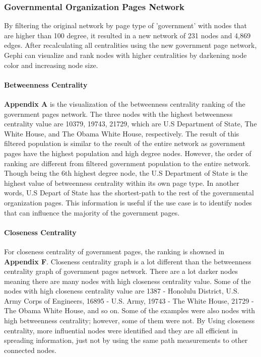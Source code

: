 \documentclass[11pt,twocolumn]{article}
\begin{document}
\subsubsection{Governmental Organization Pages Network}
By filtering the original network by page type of 'government' with nodes that are higher than 100 degree, it resulted in a new network of 231 nodes and 4,869 edges. After recalculating all centralities using the new government page network, Gephi can visualize and rank nodes with higher centralities by darkening node color and increasing node size. 

\paragraph{Betweenness Centrality}
\textbf{Appendix A} is the visualization of the betweenness centrality ranking of the government pages network. The three nodes with the highest betweenness centrality value are 10379, 19743, 21729, which are U.S Department of State, The White House, and The Obama White House, respectively. The result of this filtered population is similar to the result of the entire network as government pages have the highest population and high degree nodes. However, the order of ranking are different from filtered government population to the entire network. Though being the 6th highest degree node, the U.S Department of State is the highest value of betweenness centrality within its own page type. In another words, U.S Depart of State has the shortest-path to the rest of the governmental organization pages. This information is useful if the use case is to identify nodes that can influence the majority of the government pages. 

\paragraph{Closeness Centrality}
For closeness centrality of government pages, the ranking is showned in \textbf{Appendix F}. Closeness centrality graph is a lot different than the betweenness centrality graph of government pages network. There are a lot darker nodes meaning there are many nodes with high closeness centrality value. Some of the nodes with high closeness centrality value are 1387 - Honolulu District, U.S. Army Corps of Engineers, 16895 - U.S. Army, 19743 - The White House, 21729 - The Obama White House, and so on. Some of the examples were also nodes with high betweenness centrality; however, some of them were not. By Using closeness centrality, more influential nodes were identified and they are all efficient in spreading information, just not by using the same path measurements to other connected nodes.
\end{document}
